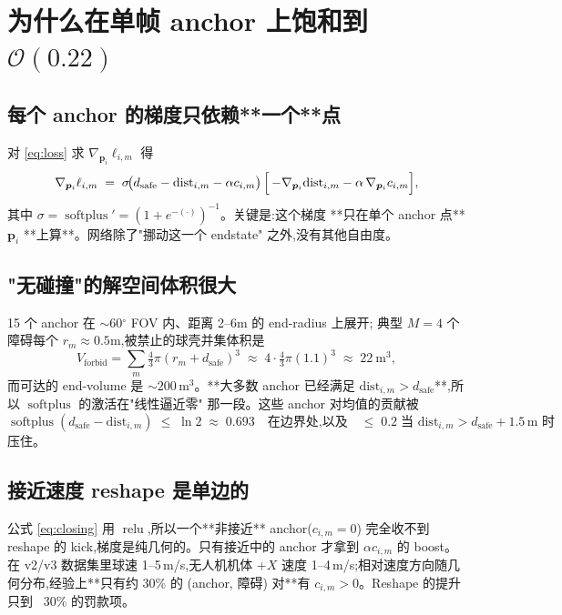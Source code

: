 \documentclass[UTF8, 11pt]{ctexart}
\newcommand{\relu}{\operatorname{relu}}
\newcommand{\softplus}{\operatorname{softplus}}
\begin{document}
\section{为什么在单帧 anchor 上饱和到 $\mathcal{O}(0.22)$}

\subsection{每个 anchor 的梯度只依赖**一个**点}

对 \eqref{eq:loss} 求 $\nabla_{\bm{p}_i} \ell_{i,m}$ 得
\begin{equation}\label{eq:grad}
\nabla_{\bm{p}_i} \ell_{i,m}
\;=\;
\sigma\!\bigl(d_{\text{safe}} - \mathrm{dist}_{i,m} - \alpha c_{i,m}\bigr)
\,\Bigl[\,
   -\nabla_{\bm{p}_i} \mathrm{dist}_{i,m}
   -\alpha\,\nabla_{\bm{p}_i} c_{i,m}
\Bigr],
\end{equation}
其中 $\sigma = \softplus' = (1 + e^{-(\cdot)})^{-1}$。关键是:这个梯度
**只在单个 anchor 点** $\bm{p}_i$ **上算**。网络除了"挪动这一个 endstate"
之外,没有其他自由度。

\subsection{"无碰撞"的解空间体积很大}

15 个 anchor 在 $\sim$60$^\circ$ FOV 内、距离 2--6m 的 end-radius 上展开;
典型 $M=4$ 个障碍每个 $r_m \approx 0.5$m,被禁止的球壳并集体积是
\[
V_{\text{forbid}} = \sum_m \tfrac{4}{3}\pi(r_m + d_{\text{safe}})^3
\;\approx\; 4 \cdot \tfrac{4}{3}\pi(1.1)^3 \;\approx\; 22\ \text{m}^3,
\]
而可达的 end-volume 是 $\sim$$200\,$m$^3$。**大多数 anchor 已经满足
$\mathrm{dist}_{i,m} > d_{\text{safe}}$**,所以 $\softplus$ 的激活在"线性逼近零"
那一段。这些 anchor 对均值的贡献被
\[
\softplus(d_{\text{safe}} - \mathrm{dist}_{i,m})
\;\le\;
\ln 2 \;\approx\; 0.693
\quad \text{在边界处,以及} \quad
\le\; 0.2\;\text{当 }\mathrm{dist}_{i,m} > d_{\text{safe}} + 1.5\,\text{m}\text{ 时}
\]
压住。

\subsection{接近速度 reshape 是单边的}

公式 \eqref{eq:closing} 用 $\relu$,所以一个**非接近** anchor($c_{i,m}=0$)
完全收不到 reshape 的 kick,梯度是纯几何的。只有接近中的 anchor 才拿到
$\alpha c_{i,m}$ 的 boost。在 v2/v3 数据集里球速 1--5\,m/s,无人机机体
+$X$ 速度 1--4\,m/s;相对速度方向随几何分布,经验上**只有约 30\% 的
(anchor, 障碍) 对**有 $c_{i,m} > 0$。Reshape 的提升只到 ~30\% 的罚款项。
\end{document}
